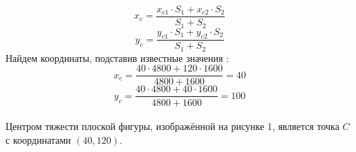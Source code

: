 \documentclass[a4paper,11pt]{article}
\begin{document}
\begin{flushleft}
\begin{enumerate}[label=\Roman{*}, ref=(\roman{*})]
\begin{equation}
				x_c = \frac{x_{c1}\cdot S_1 + x_{c2}\cdot S_2}{S_1 + S_2}
			\end{equation}
			\begin{equation}
				y_c = \frac{y_{c1}\cdot S_1 + y_{c2}\cdot S_2}{S_1 + S_2}
			\end{equation}
			Найдем координаты, подставив известные значения : 
			\begin{equation}
				x_c = \frac{40\cdot 4800 + 120\cdot 1600}{4800 + 1600} = 40
			\end{equation}
			\begin{equation}
				y_c = \frac{40\cdot 4800 + 40\cdot 1600}{4800 + 1600} = 100
			\end{equation}
			\\
			\medskip
					Центром тяжести плоской фигуры, изображённой на рисунке 1, является точка   
$C$ с координатами $(40,120)$.			  
 		\end{enumerate}
	
 	\end{flushleft} 		
\end{document}
